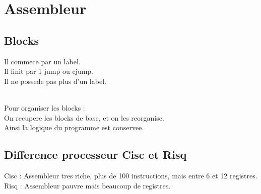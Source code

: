 \documentclass[a4paper,11pt]{article}
\begin{document}
\section{Assembleur}
\subsection{Blocks}
Il commece par un label.\\
Il finit par 1 jump ou cjump.\\
Il ne possede pas plus d'un label.\\

\

Pour organiser les blocks :\\
On recupere les blocks de base, et on les reorganise.\\
Ainsi la logique du programme est conservee.\\

\subsection{Difference processeur Cisc et Risq }
Cisc : Assembleur tres riche, plus de 100 instructions, mais entre 6 et 12 registres.\\
Risq : Assembleur pauvre mais beaucoup de registres.\\
\end{document}
